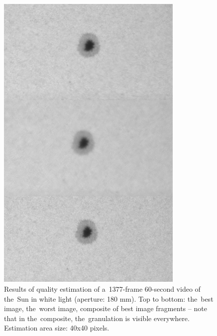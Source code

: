 \documentclass[12pt]{article}
\begin{document}
\begin{figure}[H]
\centering
\includegraphics[width=0.8\textwidth]{quality_sun.png}
\caption{Results of quality estimation of a~1377-frame 60-second video of the~Sun in white light (aperture: 180 mm). Top
to bottom: the~best image, the~worst image, composite of best image fragments -- note that in the~composite,
the~granulation is visible everywhere. Estimation area size: 40x40 pixels.}
\label{fig:qualitysun}
\end{figure}
\end{document}
